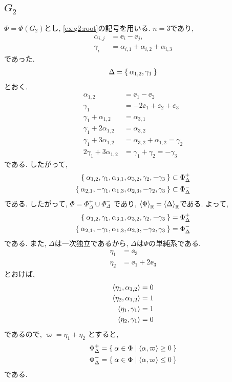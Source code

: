 \subsection{$G_2$}
\label{ex:g2:simple}
$\Phi=\Phi(G_2)$とし,
\cref{ex:g2:root}の記号を用いる.
$n=3$であり,
\begin{align*}
  \alpha_{i,j}&=\ee_i-\ee_j,\\
  \gamma_{i}&=\alpha_{i,1}+\alpha_{i,2}+\alpha_{i,3}
\end{align*}
であった.
\begin{align*}
  \Delta=\Set{\alpha_{1,2},\gamma_{1}}
\end{align*}
とおく.
\begin{align*}
  \alpha_{1,2}&=\ee_1-\ee_2\\
  \gamma_{1}&=-2\ee_1+\ee_2+\ee_3\\
  \gamma_{1}+\alpha_{1,2}&=\alpha_{3,1}\\
  \gamma_{1}+2\alpha_{1,2}&=\alpha_{3,2}\\
  \gamma_{1}+3\alpha_{1,2}&=\alpha_{3,2}+\alpha_{1,2}=\gamma_{2}\\
  2\gamma_{1}+3\alpha_{1,2}&=\gamma_1+\gamma_{2}=-\gamma_3
\end{align*}
である.  したがって,
\begin{align*}
\Set{ \alpha_{1,2},\gamma_{1}, \alpha_{3,1},\alpha_{3,2},\gamma_{2},-\gamma_3}
&\subset
  \Phi_\Delta^+\\
\Set{ \alpha_{2,1},-\gamma_{1}, \alpha_{1,3},\alpha_{2,3},-\gamma_{2},\gamma_3}
&\subset
  \Phi_\Delta^-
\end{align*}
である.
したがって, $\Phi=\Phi_\Delta^+\cup\Phi_\Delta^-$
であり,
$\Braket{\Phi}_{\mathbb{R}}=\Braket{\Delta}_{\mathbb{R}}$である.
よって, 
\begin{align*}
\Set{ \alpha_{1,2},\gamma_{1}, \alpha_{3,1},\alpha_{3,2},\gamma_{2},-\gamma_3}
&=
  \Phi_\Delta^+\\
\Set{ \alpha_{2,1},-\gamma_{1}, \alpha_{1,3},\alpha_{2,3},-\gamma_{2},\gamma_3}
&=
  \Phi_\Delta^-
\end{align*}
である.
また, $\Delta$は一次独立であるから,
$\Delta$は$\Phi$の単純系である.
\begin{align*}
  \eta_1&=\ee_3\\
  \eta_2&=\ee_1+2\ee_3
\end{align*}
とおけば,
\begin{align*}
  \Braket{\eta_1,\alpha_{1,2}}&=0\\
  \Braket{\eta_2,\alpha_{1,2}}&=1\\
  \Braket{\eta_1,\gamma_{1}}&=1\\
  \Braket{\eta_2,\gamma_{1}}&=0\\
\end{align*}
であるので, $\varpi=\eta_1+\eta_2$
  とすると,
\begin{align*}
\Phi_\Delta^+&=\Set{\alpha\in\Phi|\Braket{\alpha,\varpi}\geq 0}\\
\Phi_\Delta^-&=\Set{\alpha\in\Phi|\Braket{\alpha,\varpi}\leq 0}
\end{align*}
である.


